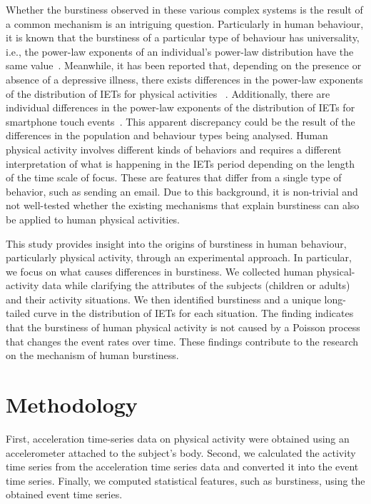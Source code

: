 \documentclass{bmcart}
\begin{document}
Whether the burstiness observed in these various complex systems is the result of a common mechanism is an intriguing question. %
Particularly in human behaviour, it is known that the burstiness of a particular type of behaviour has universality, i.e., the power-law exponents of an individual's power-law distribution have the same value~\cite{PhysRevE.73.036127}. 
Meanwhile, it has been reported that, depending on the presence or absence of a depressive illness, there exists differences in the power-law exponents of the distribution of IETs for physical activities ~\cite{PhysRevLett.99.138103}. Additionally, there are individual differences in the power-law exponents of the distribution of IETs for smartphone touch events~\cite{PhysRevE.102.012307}.
This apparent discrepancy could be the result of the differences in the population and behaviour types being analysed. %
Human physical activity involves different kinds of behaviors and requires a different interpretation of what is happening in the IETs period depending on the length of the time scale of focus. These are features that differ from a single type of behavior, such as sending an email. Due to this background, it is non-trivial and not well-tested whether the existing mechanisms that explain burstiness can also be applied to human physical activities.

This study provides insight into the origins of burstiness in human behaviour, particularly physical activity, through an experimental approach. In particular, we focus on what causes differences in burstiness. We collected human physical-activity data while clarifying the attributes of the subjects (children or adults) and their activity situations. We then identified burstiness and a unique long-tailed curve in the distribution of IETs for each situation. The finding indicates that the burstiness of human physical activity is not caused by a Poisson process that changes the event rates over time. These ﬁndings contribute to the research on the mechanism of human  burstiness. 

\section{Methodology}
First, acceleration time-series data on physical activity were obtained using an accelerometer attached to the subject's body. Second, we calculated the activity time series from the acceleration time series data and converted it into the event time series. Finally, we computed statistical features, such as burstiness, using the obtained event time series.
\end{document}
